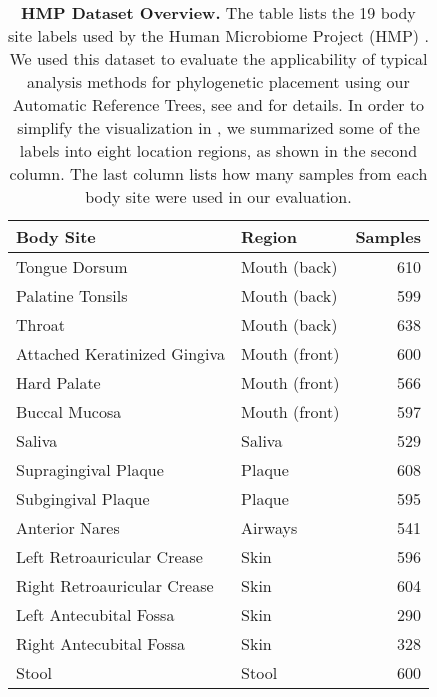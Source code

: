 \begin{table}[htb]
\caption[HMP Dataset Overview]{
\textbf{HMP Dataset Overview.}
The table lists the 19 body site labels used by the Human Microbiome Project (HMP) \citep{Huttenhower2012,Methe2012}.
We used this dataset to evaluate the applicability of typical analysis methods for phylogenetic placement
using our Automatic Reference Trees,
see  and  for details.
In order to simplify the visualization in ,
we summarized some of the labels into eight location regions, as shown in the second column.
The last column lists how many samples from each body site were used in our evaluation.
}
\label{tab:hmp_data_overview}
{
    \begin{center}
    \begin{tabular}{llr}
        \toprule
        Body Site                       & Region            & Samples   \\
        \midrule
        Tongue Dorsum                   & Mouth (back)      & 610   \\
        Palatine Tonsils                & Mouth (back)      & 599   \\
        Throat                          & Mouth (back)      & 638   \\
        Attached Keratinized Gingiva    & Mouth (front)     & 600   \\
        Hard Palate                     & Mouth (front)     & 566   \\
        Buccal Mucosa                   & Mouth (front)     & 597   \\
        Saliva                          & Saliva            & 529   \\
        Supragingival Plaque            & Plaque            & 608   \\
        Subgingival Plaque              & Plaque            & 595   \\
        Anterior Nares                  & Airways           & 541   \\
        Left Retroauricular Crease      & Skin              & 596   \\
        Right Retroauricular Crease     & Skin              & 604   \\
        Left Antecubital Fossa          & Skin              & 290   \\
        Right Antecubital Fossa         & Skin              & 328   \\
        Stool                           & Stool             & 600   \\

\end{tabular}
\end{center}}
\end{table}

